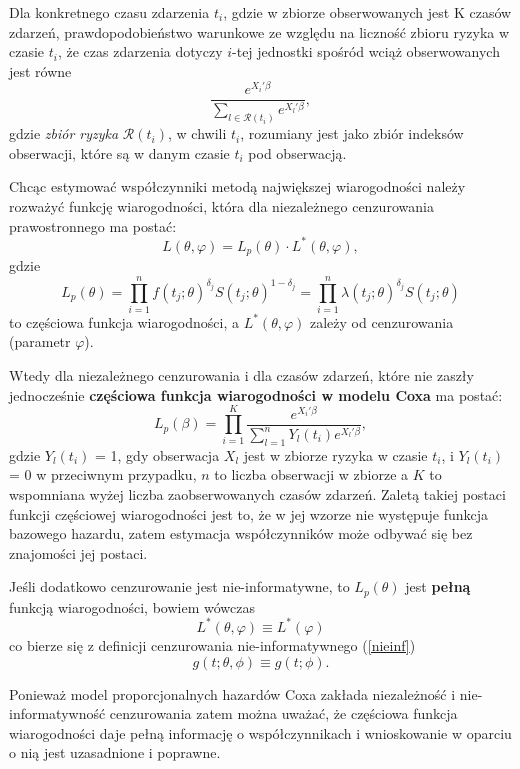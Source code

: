 Dla konkretnego czasu zdarzenia $t_i$, gdzie w zbiorze obserwowanych jest K czasów zdarzeń, prawdopodobieństwo warunkowe ze względu na liczność zbioru ryzyka w czasie $t_i$, że czas zdarzenia dotyczy $i$-tej jednostki spośród wciąż obserwowanych jest równe
\begin{equation}
\dfrac{e^{X_i'\beta}}{\sum\limits_{l\in \mathscr{R}(t_i)}^{}e^{X_l'\beta}},
\end{equation}
gdzie \textit{zbiór ryzyka} $\mathscr{R}(t_i)$, w chwili $t_i$, rozumiany jest jako zbiór indeksów obserwacji, które są w danym czasie $t_i$ pod obserwacją.

Chcąc estymować współczynniki metodą największej wiarogodności należy rozważyć funkcję wiarogodności, która dla niezależnego cenzurowania prawostronnego ma postać:
\begin{equation}
L(\theta,\varphi) = L_p(\theta)\cdot L^{*}(\theta,\varphi),
\end{equation}
gdzie
\begin{equation}
L_p(\theta) = \prod\limits_{i=1}^{n}f(t_j;\theta)^{\delta_j}S(t_j;\theta)^{1-\delta_j}=\prod\limits_{i=1}^{n}\lambda(t_j;\theta)^{\delta_j}S(t_j;\theta)
\end{equation}
to częściowa funkcja wiarogodności, a $L^{*}(\theta,\varphi)$ zależy od cenzurowania (parametr $\varphi$).

Wtedy dla niezależnego cenzurowania i dla czasów zdarzeń, które nie zaszły jednocześnie \textbf{częściowa funkcja wiarogodności w modelu Coxa} ma postać:
\begin{equation}
L_p(\beta) = \prod\limits_{i=1}^{K}\dfrac{e^{X_i'\beta}}{\sum\limits_{l=1}^{n}Y_l(t_i)e^{X_l'\beta}},
\end{equation}
gdzie $Y_l(t_i)$ = 1, gdy obserwacja $X_l$ jest w zbiorze ryzyka w czasie $t_i$, i $Y_l(t_i)$ = 0 w przeciwnym przypadku, $n$ to liczba obserwacji w zbiorze a $K$ to wspomniana wyżej liczba zaobserwowanych czasów zdarzeń. Zaletą takiej postaci funkcji częściowej wiarogodności jest to, że w jej wzorze nie występuje funkcja bazowego hazardu, zatem estymacja współczynników może odbywać się bez znajomości jej postaci.

Jeśli dodatkowo cenzurowanie jest nie-informatywne, to $L_p(\theta)$ jest \textbf{pełną} funkcją wiarogodności, bowiem wówczas $$L^{*}(\theta,\varphi)\equiv L^{*}(\varphi)$$ co bierze się z definicji cenzurowania nie-informatywnego (\ref{nieinf}) $$g(t;\theta, \phi) \equiv g(t;\phi).$$

Ponieważ model proporcjonalnych hazardów Coxa zakłada niezależność i nie-informatywność cenzurowania zatem można uważać, że częściowa funkcja wiarogodności daje pełną informację o współczynnikach i wnioskowanie w oparciu o nią jest uzasadnione i poprawne.

